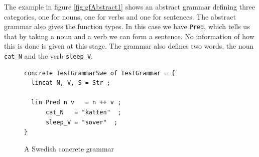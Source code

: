 \documentclass{report}
\begin{document}
The example in figure \ref{fig:gfAbstract1} shows an abstract grammar defining three categories, %
one for nouns, one for verbs and one for sentences. The abstract grammar also gives
the function types. In this case we have \verb|Pred|, which tells us that by
taking a noun and a verb we can form a sentence.  No information of how this is
done is given at this stage. The grammar also defines two words, the noun
\verb|cat_N| and the verb \verb|sleep_V|. 

\begin{figure}[h]
\begin{verbatim}
concrete TestGrammarSwe of TestGrammar = {
  lincat N, V, S = Str ;
   
  lin Pred n v   = n ++ v ;
      cat_N   = "katten"  ;
      sleep_V = "sover"  ;
}
\end{verbatim}
\caption{A Swedish concrete grammar}
\label{fig:gfSweCnc1}
\end{figure}
\end{document}

